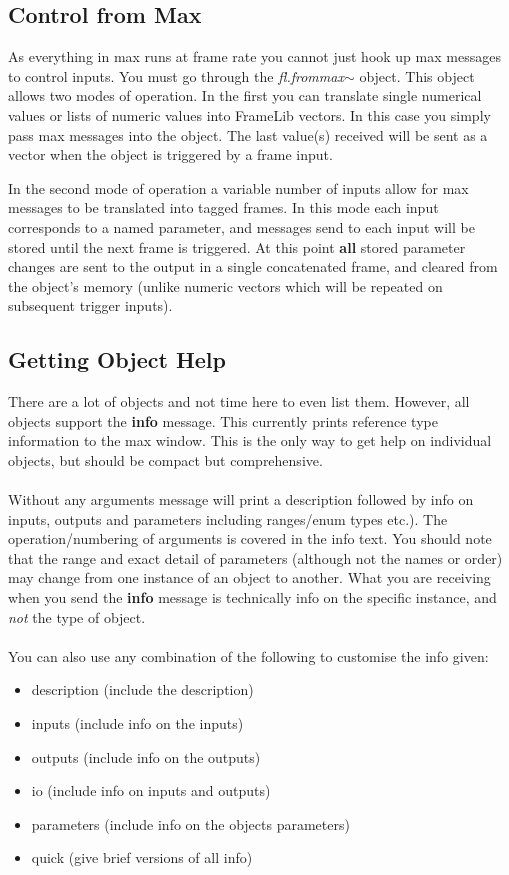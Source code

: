 \documentclass{article}
\newcommand{\flobject}[1]{\textit{fl.#1$\sim$}}
\begin{document}
\subsection{Control from Max}

As everything in max runs at frame rate you cannot just hook up max messages to control inputs. You must go through the \flobject{frommax} object. This object allows two modes of operation. In the first you can translate single numerical values or lists of numeric values into FrameLib vectors. In this case you simply pass max messages into the object. The last value(s) received will be sent as a vector when the object is triggered by a frame input.

In the second mode of operation a variable number of  inputs allow for max messages to be translated into tagged frames. In this mode each input corresponds to a named parameter, and messages send to each input will be stored until the next frame is triggered. At this point \textbf{all} stored parameter changes are sent to the output in a single concatenated frame, and cleared from the object's memory (unlike numeric vectors which will be repeated on subsequent trigger inputs).

\subsection{\label{sec:info}Getting Object Help}

There are a lot of objects and not time here to even list them. However, all objects support the \textbf{info} message. This currently prints reference type information to the max window. This is the only way to get help on individual objects, but should be compact but comprehensive.
\\ \\
Without any arguments message will print a description followed by info on inputs, outputs and parameters including ranges/enum types etc.). The operation/numbering of arguments is covered in the info text. You should note that the range and exact detail of parameters (although not the names or order) may change from one instance of an object to another. What you are receiving when you send the \textbf{info} message is technically info on the specific instance, and \textit{not} the type of object.
\\ \\
You can also use any combination of the following to customise the info given:
 
 \begin{itemize}
 \item{description (include the description)}
 \item{inputs (include info on the inputs)}
 \item{outputs  (include info on the outputs)}
 \item{io (include info on inputs and outputs)}
 \item{parameters (include info on the objects parameters)}
 \item{quick (give brief versions of all info)}
  \end{itemize}
\end{document}
